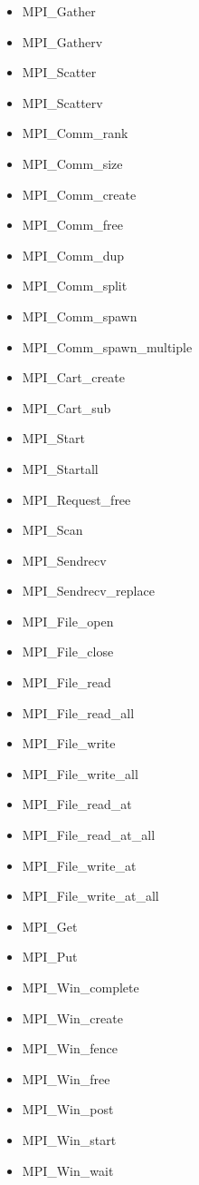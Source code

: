 \begin{itemize}
\item MPI\_Gather
\item MPI\_Gatherv
\item MPI\_Scatter
\item MPI\_Scatterv
\item MPI\_Comm\_rank
\item MPI\_Comm\_size
\item MPI\_Comm\_create
\item MPI\_Comm\_free
\item MPI\_Comm\_dup
\item MPI\_Comm\_split
\item MPI\_Comm\_spawn
\item MPI\_Comm\_spawn\_multiple
\item MPI\_Cart\_create
\item MPI\_Cart\_sub
\item MPI\_Start
\item MPI\_Startall
\item MPI\_Request\_free
\item MPI\_Scan
\item MPI\_Sendrecv
\item MPI\_Sendrecv\_replace
\item MPI\_File\_open\footnotemark[2]
\item MPI\_File\_close\footnotemark[2]
\item MPI\_File\_read\footnotemark[2]
\item MPI\_File\_read\_all\footnotemark[2]
\item MPI\_File\_write\footnotemark[2]
\item MPI\_File\_write\_all\footnotemark[2]
\item MPI\_File\_read\_at\footnotemark[2]
\item MPI\_File\_read\_at\_all\footnotemark[2]
\item MPI\_File\_write\_at\footnotemark[2]
\item MPI\_File\_write\_at\_all\footnotemark[2]
\item MPI\_Get\footnotemark[3]
\item MPI\_Put\footnotemark[3]
\item MPI\_Win\_complete\footnotemark[3]
\item MPI\_Win\_create\footnotemark[3]
\item MPI\_Win\_fence\footnotemark[3]
\item MPI\_Win\_free\footnotemark[3]
\item MPI\_Win\_post\footnotemark[3]
\item MPI\_Win\_start\footnotemark[3]
\item MPI\_Win\_wait\footnotemark[3]
\end{itemize}


